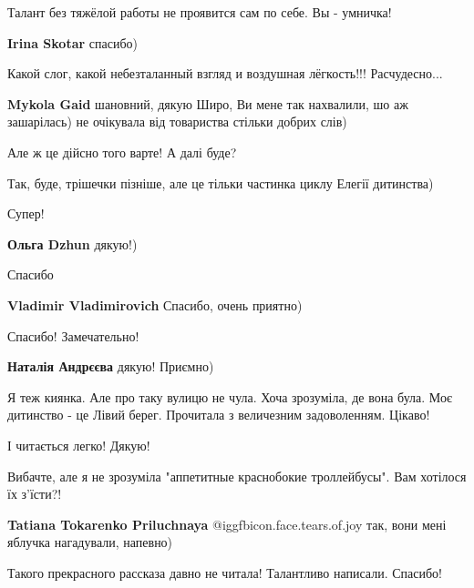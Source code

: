 \begin{itemize}
\begin{itemize}
Талант без тяжёлой работы не проявится сам по себе. Вы - умничка!

\textbf{Irina Skotar} спасибо)
\end{itemize} %


Какой слог, какой небезталанный взгляд и воздушная лёгкость!!! Расчудесно...

\begin{itemize} %
\textbf{Mykola Gaid} шановний, дякую Широ, Ви мене так нахвалили, шо аж зашарілась) не очікувала від товариства стільки добрих слів)

Але ж це дійсно того варте! А далі буде?

Так, буде, трішечки пізніше, але це тільки частинка циклу Елегії дитинства)
\end{itemize} %

Супер!

\textbf{Ольга Dzhun} дякую!)

Спасибо

\textbf{Vladimir Vladimirovich} Спасибо, очень приятно)

Спасибо! Замечательно!

\begin{itemize} %
\textbf{Наталія Андрєєва} дякую! Приємно)


Я теж киянка. Але про таку вулицю не чула. Хоча зрозуміла, де вона була. Моє
дитинство - це Лівий берег. Прочитала з величезним задоволенням. Цікаво!

І читається легко! Дякую!

\end{itemize} %


Вибачте, але я не зрозуміла "аппетитные краснобокие троллейбусы". Вам хотілося
їх з'їсти?!

\begin{itemize} %
\textbf{Tatiana Tokarenko Priluchnaya}  @igg{fbicon.face.tears.of.joy}  так, вони мені яблучка нагадували, напевно)
\end{itemize} %

Такого прекрасного рассказа давно не читала! Талантливо написали. Спасибо!


\end{itemize}
